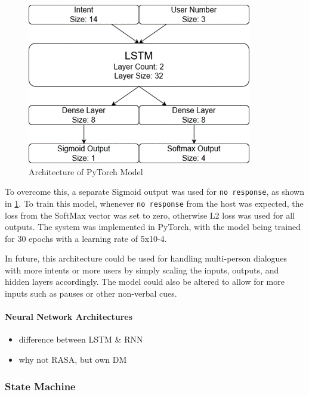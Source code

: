 \documentclass[hidelinks, 11pt]{article}
\begin{document}
\begin{figure}
  \includegraphics[width=\columnwidth]{images/DM_LSTM.png}
  \caption{Architecture of PyTorch Model}
  \label{fig:model_architecture}
\end{figure}

To overcome this, a separate Sigmoid output was used for \verb|no response|, as shown in \cref{fig:model_architecture}. To train this model, whenever \verb|no response| from the host was expected, the loss from the SoftMax vector was set to zero, otherwise L2 loss was used for all outputs. The system was implemented in PyTorch, with the model being trained for 30 epochs with a learning rate of 5x10-4.

In future, this architecture could be used for handling multi-person dialogues with more intents or more users by simply scaling the inputs, outputs, and hidden layers accordingly. The model could also be altered to allow for more inputs such as pauses or other non-verbal cues.

\paragraph{Neural Network Architectures}
\label{par:nn_architectures}

\begin{itemize}
  \item difference between LSTM \& RNN
  \item why not RASA, but own DM
\end{itemize}

\subsubsection{State Machine}
\label{subsec:dm}
\end{document}
